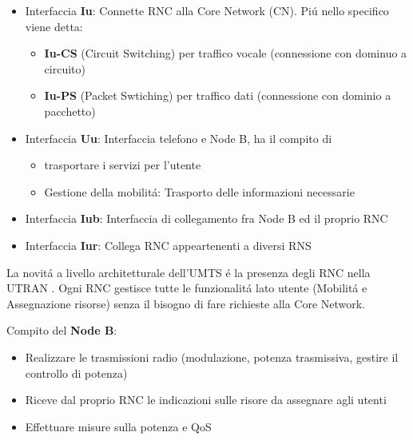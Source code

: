 \documentclass{article}
\begin{document}
\begin{itemize}
    \item Interfaccia \textbf{Iu}: Connette RNC alla Core Network (CN). Pi\'u nello specifico viene detta:
        \begin{itemize}
            \item \textbf{Iu-CS} (Circuit Switching) per traffico vocale (connessione con dominuo a circuito)
            \item \textbf{Iu-PS} (Packet Swtiching)  per traffico dati (connessione con dominio a pacchetto)
        \end{itemize}

    \item Interfaccia \textbf{Uu}: Interfaccia telefono e Node B, ha il compito di
        \begin{itemize}
            \item trasportare i servizi per l'utente
            \item Gestione della mobilit\'a: Trasporto delle informazioni necessarie
        \end{itemize}

    \item Interfaccia \textbf{Iub}: Interfaccia di collegamento fra Node B ed il proprio RNC
    \item Interfaccia \textbf{Iur}: Collega RNC appeartenenti a diversi RNS
\end{itemize}


La novit\'a a livello architetturale dell'UMTS \'e la presenza degli RNC nella UTRAN . Ogni RNC gestisce tutte le funzionalit\'a lato utente (Mobilit\'a e Assegnazione risorse) senza il bisogno di fare richieste alla Core Network.

Compito del \textbf{Node B}:
\begin{itemize}
    \item Realizzare le trasmissioni radio (modulazione, potenza trasmissiva, gestire il controllo di potenza)
    \item Riceve dal proprio RNC le indicazioni sulle risore da assegnare agli utenti
    \item Effettuare misure sulla potenza e QoS
\end{itemize}
\end{document}
